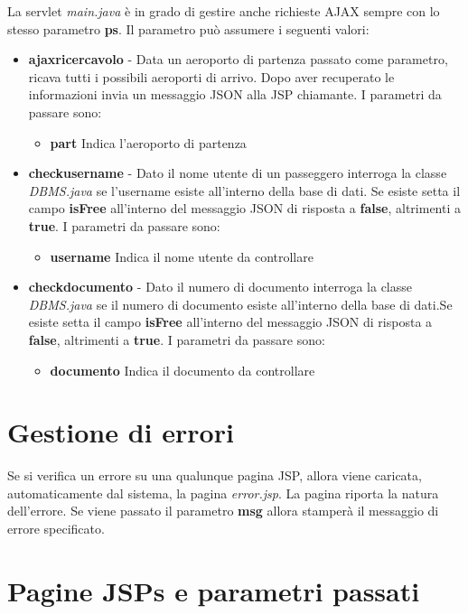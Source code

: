 \documentclass[a4paper,10pt]{article}
\begin{document}
 La servlet \textit{main.java} \`e in grado di gestire anche richieste AJAX sempre con lo stesso parametro \textbf{ps}. Il parametro pu\`o assumere i seguenti valori:
 \begin{itemize}
 \item \textbf{ajaxricercavolo} - Data un aeroporto di partenza passato come parametro, ricava tutti i possibili aeroporti di arrivo. Dopo aver recuperato le informazioni invia un messaggio JSON alla JSP
				  chiamante.
				  I parametri da passare sono:
				  \begin{itemize}
				   \item \textbf{part} Indica l'aeroporto di partenza
				  \end{itemize}

 \item \textbf{checkusername} - Dato il nome utente di un passeggero interroga la classe \textit{DBMS.java} se l'username esiste all'interno della base di dati. Se esiste setta il campo \textbf{isFree} all'interno 
				del messaggio JSON di risposta a \textbf{false}, altrimenti a \textbf{true}.
				  I parametri da passare sono:
				  \begin{itemize}
				   \item \textbf{username} Indica il nome utente da controllare
				  \end{itemize}
 \item \textbf{checkdocumento} - Dato il numero di documento interroga la classe \textit{DBMS.java} se il numero di documento esiste all'interno della base di dati.Se esiste setta il campo \textbf{isFree} all'interno 
				del messaggio JSON di risposta a \textbf{false}, altrimenti a \textbf{true}.
 				  I parametri da passare sono:
				  \begin{itemize}
				   \item \textbf{documento} Indica il documento da controllare
				  \end{itemize}
\end{itemize}

\section{Gestione di errori}
Se si verifica un errore su una qualunque pagina JSP, allora viene caricata, automaticamente dal 
sistema, la pagina \textit{error.jsp}. La pagina riporta la natura dell'errore. Se viene passato il parametro \textbf{msg} allora 
stamper\`a il messaggio di errore specificato.

\section{Pagine JSPs e parametri passati}
\end{document}
